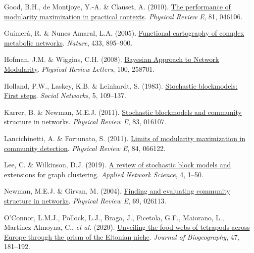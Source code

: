 \documentclass[
]{article}
\newlength{\cslhangindent}
\newlength{\cslentryspacingunit} %
\newenvironment{CSLReferences}[2] %
 {%
  \setlength{\parindent}{0pt}
  \ifodd #1
  \let\oldpar\par
  \def\par{\hangindent=\cslhangindent\oldpar}
  \fi
  \setlength{\parskip}{#2\cslentryspacingunit}
 }%
 {}
\begin{document}
\begin{CSLReferences}{1}{0}
\leavevmode{}%
Good, B.H., de Montjoye, Y.-A. \& Clauset, A. (2010).
\href{https://doi.org/10.1103/PhysRevE.81.046106}{The performance of
modularity maximization in practical contexts}. \emph{Physical Review
E}, 81, 046106.

\leavevmode{}%
Guimerà, R. \& Nunes Amaral, L.A. (2005).
\href{https://doi.org/10.1038/nature03288}{Functional cartography of
complex metabolic networks}. \emph{Nature}, 433, 895--900.

\leavevmode{}%
Hofman, J.M. \& Wiggins, C.H. (2008).
\href{https://doi.org/10.1103/PhysRevLett.100.258701}{Bayesian
{Approach} to {Network Modularity}}. \emph{Physical Review Letters},
100, 258701.

\leavevmode{}%
Holland, P.W., Laskey, K.B. \& Leinhardt, S. (1983).
\href{https://doi.org/10.1016/0378-8733(83)90021-7}{Stochastic
blockmodels: {First} steps}. \emph{Social Networks}, 5, 109--137.

\leavevmode{}%
Karrer, B. \& Newman, M.E.J. (2011).
\href{https://doi.org/10.1103/PhysRevE.83.016107}{Stochastic blockmodels
and community structure in networks}. \emph{Physical Review E}, 83,
016107.

\leavevmode{}%
Lancichinetti, A. \& Fortunato, S. (2011).
\href{https://doi.org/10.1103/PhysRevE.84.066122}{Limits of modularity
maximization in community detection}. \emph{Physical Review E}, 84,
066122.

\leavevmode{}%
Lee, C. \& Wilkinson, D.J. (2019).
\href{https://doi.org/10.1007/s41109-019-0232-2}{A review of stochastic
block models and extensions for graph clustering}. \emph{Applied Network
Science}, 4, 1--50.

\leavevmode{}%
Newman, M.E.J. \& Girvan, M. (2004).
\href{https://doi.org/10.1103/PhysRevE.69.026113}{Finding and evaluating
community structure in networks}. \emph{Physical Review E}, 69, 026113.

\leavevmode{}%
O'Connor, L.M.J., Pollock, L.J., Braga, J., Ficetola, G.F., Maiorano,
L., Martinez-Almoyna, C., \emph{et al.} (2020).
\href{https://doi.org/10.1111/jbi.13773}{Unveiling the food webs of
tetrapods across {Europe} through the prism of the {Eltonian} niche}.
\emph{Journal of Biogeography}, 47, 181--192.


\end{CSLReferences}
\end{document}
